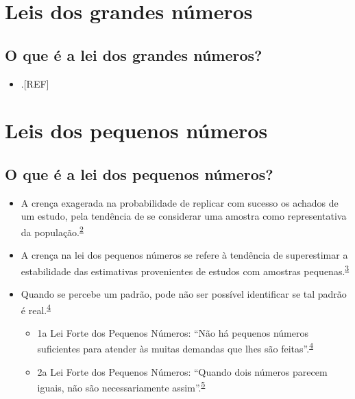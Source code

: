 \documentclass[
  a4paper,
]{book}
\providecommand{\tightlist}{%
  \setlength{\itemsep}{0pt}\setlength{\parskip}{0pt}}
\begin{document}
\hypertarget{lei-grandes-numeros}{%
\section{Leis dos grandes números}\label{lei-grandes-numeros}}

\hypertarget{o-que-uxe9-a-lei-dos-grandes-nuxfameros}{%
\subsection{O que é a lei dos grandes números?}\label{o-que-uxe9-a-lei-dos-grandes-nuxfameros}}

\begin{itemize}
\tightlist
\item
  .{[}REF{]}
\end{itemize}

\hypertarget{lei-pequenos-numeros}{%
\section{Leis dos pequenos números}\label{lei-pequenos-numeros}}

\hypertarget{o-que-uxe9-a-lei-dos-pequenos-nuxfameros}{%
\subsection{O que é a lei dos pequenos números?}\label{o-que-uxe9-a-lei-dos-pequenos-nuxfameros}}

\begin{itemize}
\item
  A crença exagerada na probabilidade de replicar com sucesso os achados de um estudo, pela tendência de se considerar uma amostra como representativa da população.\textsuperscript{\protect\hyperlink{ref-tversky1971}{2}}
\item
  A crença na lei dos pequenos números se refere à tendência de superestimar a estabilidade das estimativas provenientes de estudos com amostras pequenas.\textsuperscript{\protect\hyperlink{ref-bishop2022}{3}}
\item
  Quando se percebe um padrão, pode não ser possível identificar se tal padrão é real.\textsuperscript{\protect\hyperlink{ref-guy1988}{4}}

  \begin{itemize}
  \item
    1a Lei Forte dos Pequenos Números: ``Não há pequenos números suficientes para atender às muitas demandas que lhes são feitas''.\textsuperscript{\protect\hyperlink{ref-guy1988}{4}}
  \item
    2a Lei Forte dos Pequenos Números: ``Quando dois números parecem iguais, não são necessariamente assim''.\textsuperscript{\protect\hyperlink{ref-guy1990}{5}}
  \end{itemize}
\end{itemize}
\end{document}
